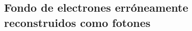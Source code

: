 \begin{table}[!ht]
{\begin{tabular}{c|l|ccc}


  \end{tabular}
  }
  \label{tab:jfake_ff}
\end{table}



\subsection{Fondo de electrones erróneamente reconstruidos como fotones}\label{sec:efakes}

